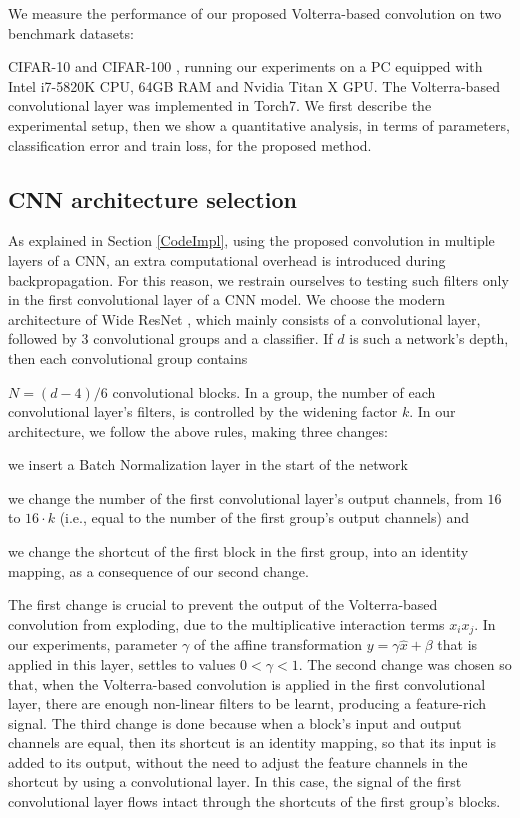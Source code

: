 \documentclass[10pt,twocolumn,letterpaper]{article}
\begin{document}
     We measure the performance of our proposed Volterra-based convolution on two benchmark datasets:
     
     CIFAR-10 and CIFAR-100 \cite{Kriz09}, running our experiments on a PC equipped with  Intel i7-5820K CPU, 64GB RAM and Nvidia Titan X GPU. The Volterra-based convolutional layer was implemented in Torch7. We first describe the experimental setup, then we show a quantitative analysis, in terms of parameters, classification error and train loss, for the proposed method.

\subsection{CNN architecture selection}

   As explained in Section \ref{CodeImpl}, using the proposed convolution in multiple layers of a CNN, an extra computational overhead is introduced during backpropagation. For this reason, we restrain ourselves to testing such filters only in the first convolutional layer of a CNN model. We choose the modern architecture of Wide ResNet \cite{WRN16}, which mainly consists of a convolutional layer, followed by 3 convolutional groups and a classifier. If $d$ is such a network's depth, then each convolutional group contains
   
   $N=(d-4)/6$
   convolutional blocks. In a group, the number of each convolutional layer's filters, is controlled by the widening factor $k$. In our architecture, we follow the above rules, making three changes:
\begin{enumerate*}[label={\alph*)}]
\item we insert a Batch Normalization layer in the start of the network
\item we change the number of the first convolutional layer's output channels, from $16$ to $16 \cdot k$ (i.e., equal to the number of the first group's output channels) and
\item we change the shortcut of the first block in the first group, into an identity mapping, as a consequence of our second change.
\end{enumerate*}
The first change is crucial to prevent the output of the Volterra-based convolution from exploding, due to the multiplicative interaction terms $x_ix_j$. In our experiments, parameter $\gamma$ of the affine transformation $y=\gamma\hat{x}+\beta$ that is applied in this layer, settles to values $0<\gamma<1$. The second change was chosen so that, when the Volterra-based convolution is applied in the first convolutional layer, there are enough non-linear filters to be learnt, producing a feature-rich signal. The third change is done because when a block's input and output channels are equal, then its shortcut is an identity mapping, so that its input is added to its output, without the need to adjust the feature channels in the shortcut by using a convolutional layer. In this case, the signal of the first convolutional layer flows intact through the shortcuts of the first group's blocks.
\end{document}
